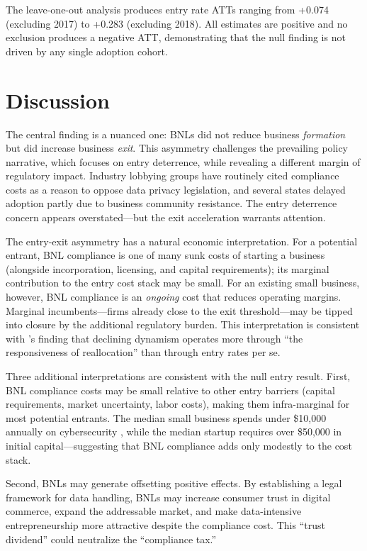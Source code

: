\documentclass[12pt]{article}
\begin{document}
The leave-one-out analysis produces entry rate ATTs ranging from +0.074 (excluding 2017) to +0.283 (excluding 2018). All estimates are positive and no exclusion produces a negative ATT, demonstrating that the null finding is not driven by any single adoption cohort.


\section{Discussion}

The central finding is a nuanced one: BNLs did not reduce business \textit{formation} but did increase business \textit{exit}. This asymmetry challenges the prevailing policy narrative, which focuses on entry deterrence, while revealing a different margin of regulatory impact. Industry lobbying groups have routinely cited compliance costs as a reason to oppose data privacy legislation, and several states delayed adoption partly due to business community resistance. The entry deterrence concern appears overstated---but the exit acceleration warrants attention.

The entry-exit asymmetry has a natural economic interpretation. For a potential entrant, BNL compliance is one of many sunk costs of starting a business (alongside incorporation, licensing, and capital requirements); its marginal contribution to the entry cost stack may be small. For an existing small business, however, BNL compliance is an \textit{ongoing} cost that reduces operating margins. Marginal incumbents---firms already close to the exit threshold---may be tipped into closure by the additional regulatory burden. This interpretation is consistent with \citet{decker2020changing}'s finding that declining dynamism operates more through ``the responsiveness of reallocation'' than through entry rates per se.

Three additional interpretations are consistent with the null entry result. First, BNL compliance costs may be small relative to other entry barriers (capital requirements, market uncertainty, labor costs), making them infra-marginal for most potential entrants. The median small business spends under \$10,000 annually on cybersecurity \citep{verizon2024dbir}, while the median startup requires over \$50,000 in initial capital---suggesting that BNL compliance adds only modestly to the cost stack.

Second, BNLs may generate offsetting positive effects. By establishing a legal framework for data handling, BNLs may increase consumer trust in digital commerce, expand the addressable market, and make data-intensive entrepreneurship more attractive despite the compliance cost. This ``trust dividend'' could neutralize the ``compliance tax.''
\end{document}
